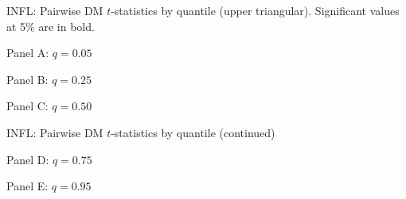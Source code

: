 \documentclass[12pt]{article}
\newcommand{\resultsdate}{2026-02-05}
\begin{document}
\begin{table}[H]
  \centering
  \caption{INFL: Pairwise DM $t$-statistics by quantile (upper triangular). Significant values at 5\% are in bold.}
  \label{tab: dm_quantile_infl}

  \begin{subtable}{\textwidth}
    \centering
    \caption*{Panel A: $q=0.05$}
    \resizebox{\textwidth}{!}{
    
    }
  \end{subtable}

  \vspace{0.5em}
  \begin{subtable}{\textwidth}
    \centering
    \caption*{Panel B: $q=0.25$}
    \resizebox{\textwidth}{!}{
    
    }
  \end{subtable}

  \vspace{0.5em}
  \begin{subtable}{\textwidth}
    \centering
    \caption*{Panel C: $q=0.50$}
    \resizebox{\textwidth}{!}{
    
    }
  \end{subtable}

\end{table}

\begin{table}[H]
  \centering
  \caption*{INFL: Pairwise DM $t$-statistics by quantile (continued)}

  \begin{subtable}{\textwidth}
    \centering
    \caption*{Panel D: $q=0.75$}
    \resizebox{\textwidth}{!}{
    
    }
  \end{subtable}

  \vspace{0.5em}
  \begin{subtable}{\textwidth}
    \centering
    \caption*{Panel E: $q=0.95$}
    \resizebox{\textwidth}{!}{
    
    }
  \end{subtable}
\end{table}
\end{document}
